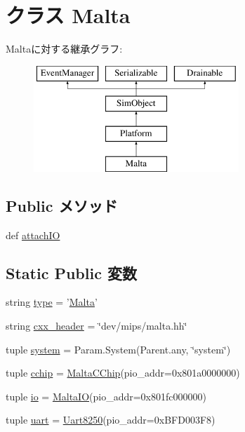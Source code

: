 \hypertarget{classMalta_1_1Malta}{
\section{クラス Malta}
\label{classMalta_1_1Malta}
}
Maltaに対する継承グラフ:\begin{figure}[H]
\begin{center}
\leavevmode
\includegraphics[height=4cm]{classMalta_1_1Malta}
\end{center}
\end{figure}
\subsection*{Public メソッド}
\begin{DoxyCompactItemize}
\item 
def \hyperlink{classMalta_1_1Malta_ac750675f6d6de3ad52f8c5b03ee45a65}{attachIO}
\end{DoxyCompactItemize}
\subsection*{Static Public 変数}
\begin{DoxyCompactItemize}
\item 
string \hyperlink{classMalta_1_1Malta_acce15679d830831b0bbe8ebc2a60b2ca}{type} = '\hyperlink{classMalta_1_1Malta}{Malta}'
\item 
string \hyperlink{classMalta_1_1Malta_a17da7064bc5c518791f0c891eff05fda}{cxx\_\-header} = \char`\"{}dev/mips/malta.hh\char`\"{}
\item 
tuple \hyperlink{classMalta_1_1Malta_ab737471139f5a296e5b26e8a0e1b0744}{system} = Param.System(Parent.any, \char`\"{}system\char`\"{})
\item 
tuple \hyperlink{classMalta_1_1Malta_ac1636e20fc3bb3fadc00255ad114ce3f}{cchip} = \hyperlink{classMalta_1_1MaltaCChip}{MaltaCChip}(pio\_\-addr=0x801a0000000)
\item 
tuple \hyperlink{classMalta_1_1Malta_a2c4f3d37bf2004da1c3daf41d84880f4}{io} = \hyperlink{classMalta_1_1MaltaIO}{MaltaIO}(pio\_\-addr=0x801fc000000)
\item 
tuple \hyperlink{classMalta_1_1Malta_a1f69fbabd17d6bca63f97f9754247cfd}{uart} = \hyperlink{classUart8250}{Uart8250}(pio\_\-addr=0xBFD003F8)
\end{DoxyCompactItemize}


